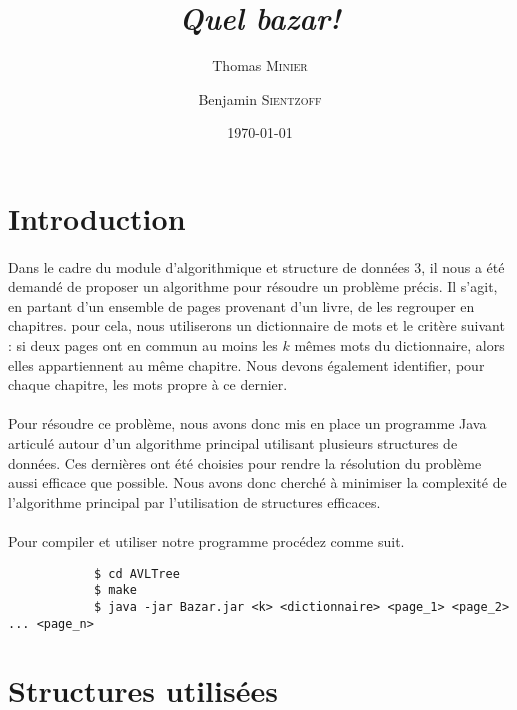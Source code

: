 \documentclass[a4paper]{article}
\title{\textit{Quel bazar!}}
\author{Thomas \textsc{Minier} \and Benjamin \textsc{Sientzoff}}
\date{\today}
\begin{document}
	\maketitle
	\vspace{5cm}
	\tableofcontents
	\newpage %
	
	\section*{Introduction}

		\paragraph{}{
		Dans le cadre du module d'algorithmique et structure de données 3, il nous a été demandé de 
		proposer un algorithme pour résoudre un problème précis. Il s'agit, en partant d'un ensemble 
		de pages provenant d'un livre, de les regrouper en chapitres. pour cela, nous utiliserons 
		un dictionnaire de mots et le critère suivant : si deux pages ont en commun au moins les 
		$k$ mêmes mots du dictionnaire, alors elles appartiennent au même chapitre. \newline
		Nous devons également identifier, pour chaque chapitre, les mots propre à ce dernier.
		}
		
		\paragraph{}{
		Pour résoudre ce problème, nous avons donc mis en place un programme Java articulé autour 
		d'un algorithme principal utilisant plusieurs structures de données. Ces dernières ont été 
		choisies pour rendre la résolution du problème aussi efficace que possible. Nous avons 
		donc cherché à minimiser la complexité de l'algorithme principal par l'utilisation de 
		structures efficaces.
		}
		
		\paragraph{}{
		Pour compiler et utiliser notre programme procédez comme suit.
		\begin{verbatim}
			$ cd AVLTree
			$ make
			$ java -jar Bazar.jar <k> <dictionnaire> <page_1> <page_2> ... <page_n>
		\end{verbatim}
		}
		
		
	\section{Structures utilisées}
	
\end{document}
